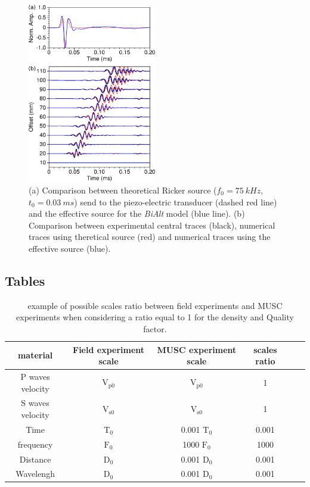 \documentclass[manuscript,revised]{geophysics}
\newcommand{\bialt}{\textit{BiAlt} }
\begin{document}
\begin{figure}[!h]
	\centering
	\includegraphics[width=0.5\textwidth]{fig/panel_bialt_lswe.eps}
	\caption{(a) Comparison between theoretical Ricker source ($f_{0}=75\ kHz$, $t_{0}=0.03\ ms$) send to the piezo-electric transducer (dashed red line) and the effective source for the \bialt model (blue line). (b) Comparison between experimental central traces (black), numerical traces using theretical source (red) and numerical traces using the effective source (blue).}
	\label{blind-test}
\end{figure}

\clearpage
\newpage

\subsection*{Tables}

\begin{table}[!ht]
	\centering
	\begin{tabular}{cccccc}
		\hline
		material & Field experiment scale & MUSC experiment scale & scales ratio  \\
		\hline
		P waves velocity & $\mathrm{V_{p 0}}$ & $\mathrm{V_{p 0}}$  & 1  \\
		S waves velocity & $\mathrm{V_{s 0}}$ &  $\mathrm{V_{s 0}}$ & 1   \\
		Time & $\mathrm{T_{0}}$    & 0.001 $\mathrm{T_{0}}$ & 0.001  \\
		frequency   & $\mathrm{F_{0}}$  & 1000 $\mathrm{F_{0}}$ & 1000  \\
		Distance   & $\mathrm{D_{0}}$  & 0.001 $\mathrm{D_{0}}$ & 0.001   \\
		Wavelengh   & $\mathrm{D_{0}}$ & 0.001 $\mathrm{D_{0}}$ & 0.001  \\
		\hline
	\end{tabular}
	\caption{ example of possible scales ratio between field experiments and MUSC experiments when considering a ratio equal to 1 for the density and Quality factor.}
	\label{epoxy-resin}
\end{table}
\end{document}
